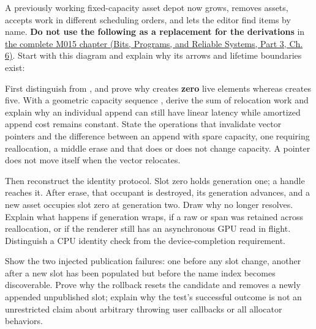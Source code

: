 \hypertarget{appendix-960160274237-a-growing-asset-store-must-preserve-its-promises-m015-retrieval}{}

A previously working fixed-capacity asset depot now grows, removes assets, accepts work in different scheduling orders, and lets the editor find items by name. \textbf{Do not use the following as a replacement for the derivations} in \href{../01-Bits-Programs-and-Reliable-Systems-P03/main.pdf\#nameddest=01-foundations-i-ch006-an-asset-registry-grows-while-its-handles-must-not-change}{the complete M015 chapter (Bits, Programs, and Reliable Systems, Part 3, Ch. 6)}. Start with this diagram and explain why its arrows and lifetime boundaries exist:


First distinguish  from , and prove why  creates \textbf{zero} live elements whereas  creates five. With a geometric capacity sequence , derive the sum of relocation work and explain why an individual append can still have linear latency while amortized append cost remains constant. State the operations that invalidate vector pointers and the difference between an append with spare capacity, one requiring reallocation, a middle erase and  that does or does not change capacity. A pointer does not move itself when the vector relocates.

Then reconstruct the identity protocol. Slot zero holds generation one; a handle  reaches it. After erase, that occupant is destroyed, its generation advances, and a new asset occupies slot zero at generation two. Draw why  no longer resolves. Explain what happens if generation wraps, if a raw  or span was retained across reallocation, or if the renderer still has an asynchronous GPU read in flight. Distinguish a CPU identity check from the device-completion requirement.

Show the two injected publication failures: one before any slot change, another after a new slot has been populated but before the name index becomes discoverable. Prove why the rollback resets the candidate and removes a newly appended unpublished slot; explain why the test's successful outcome is not an unrestricted claim about arbitrary throwing user callbacks or all allocator behaviors.

